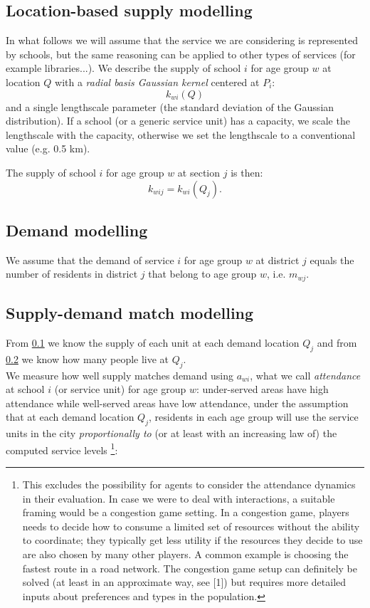 \documentclass{article}
\begin{document}
\subsection{Location-based supply modelling} \label{supply}
In what follows we will assume that the service we are considering is represented by schools, but the same reasoning can be applied to other types of services (for example libraries...).
We describe the supply of school $i$ for age group $w$ at location $Q$ with a \textit{radial basis Gaussian kernel}  centered at $P_i$: 
\[k_{wi}(Q)\]
and a single lengthscale parameter (the standard deviation of the Gaussian distribution). If a school (or a generic service unit) has a capacity, we scale the lengthscale with the capacity, otherwise we set the lengthscale to a conventional value (e.g. 0.5 km).

The supply of school $i$ for age group $w$ at section $j$ is then:
\[k_{wij}=k_{wi}(Q_j).\]

\subsection{Demand modelling}  \label{demand}
We assume that the demand of service $i$ for age group $w$ at district $j$ equals the number of residents in district $j$ that belong to age group $w$, i.e. $m_{wj}$.

\subsection{Supply-demand match modelling}
From \ref{supply} we know the supply of each unit at each demand location $Q_j$ and from \ref{demand} we know how many people live at $Q_j$. \\

We measure how well supply matches demand using $a_{wi}$, what we call \textit{attendance} at school $i$ (or service unit) for age group $w$: under-served areas have high attendance while well-served areas have low attendance, under the assumption that  at each demand location $Q_j$, residents in each age group will use the service units in the city \textit{proportionally to} (or at least with an increasing law of) the computed service levels \footnote{This excludes the possibility for agents to consider the attendance dynamics in their evaluation. In case we were to deal with interactions, a suitable framing would be a congestion game setting. In a congestion game, players needs to decide how to consume a limited set of resources without the ability to coordinate; they typically get less utility if the resources they decide to use are also chosen by many other players. A common example is choosing the fastest route in a road network.
The congestion game setup can definitely be solved (at least in an approximate way, see [1]) but requires more detailed inputs about preferences and types in the population.}:
\end{document}
